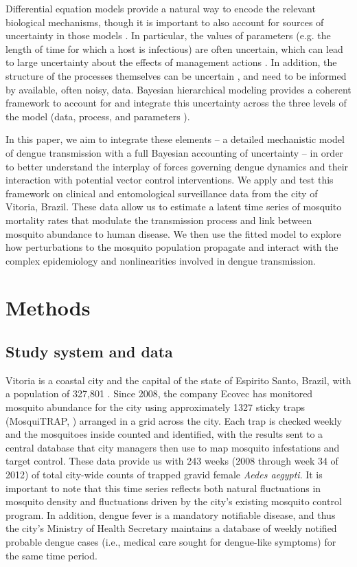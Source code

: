 \documentclass[10pt,letterpaper]{article}
\begin{document}
Differential equation models provide a natural way to encode the relevant biological mechanisms, though it is important to also account for sources of uncertainty in those models \cite{Hotelling1927, Wikle2010}.
In particular, the values of parameters (e.g. the length of time for which a host is infectious) are often uncertain, which can lead to large uncertainty about the effects of management actions \cite{Elderd2006}.
In addition, the structure of the processes themselves can be uncertain \cite{Ellner1998}, and need to be informed by available, often noisy, data.
Bayesian hierarchical modeling provides a coherent framework to account for and integrate this uncertainty across the three levels of the model (data, process, and parameters \cite{Berliner1996, Cressie2009}).

In this paper, we aim to integrate these elements -- a detailed mechanistic model of dengue transmission with a full Bayesian accounting of uncertainty -- in order to better understand the interplay of forces governing dengue dynamics and their interaction with potential vector control interventions.
We apply and test this framework on clinical and entomological surveillance data from the city of Vitoria, Brazil.
These data allow us to estimate a latent time series of mosquito mortality rates that modulate the transmission process and link between mosquito abundance to human disease.  
We then use the fitted model to explore how perturbations to the mosquito population propagate and interact with the complex epidemiology and nonlinearities involved in dengue transmission.

\section*{Methods}

\subsection*{Study system and data}

Vitoria is a coastal city and the capital of the state of Espirito Santo, Brazil, with a population of 327,801 \cite{vitpop}.
Since 2008, the company Ecovec has monitored mosquito abundance for the city using approximately 1327 sticky traps (MosquiTRAP, \cite{Eiras2009}) arranged in a grid across the city.
Each trap is checked weekly and the mosquitoes inside counted and identified, with the results sent to a central database that city managers then use to map mosquito infestations and target control.
These data provide us with 243 weeks (2008 through week 34 of 2012) of total city-wide counts of trapped gravid female \emph{Aedes aegypti}.
It is important to note that this time series reflects both natural fluctuations in mosquito density and fluctuations driven by the city's existing mosquito control program.
In addition, dengue fever is a mandatory notifiable disease, and thus the city's Ministry of Health Secretary maintains a database of weekly notified probable dengue cases (i.e., medical care sought for dengue-like symptoms) for the same time period.
\end{document}
